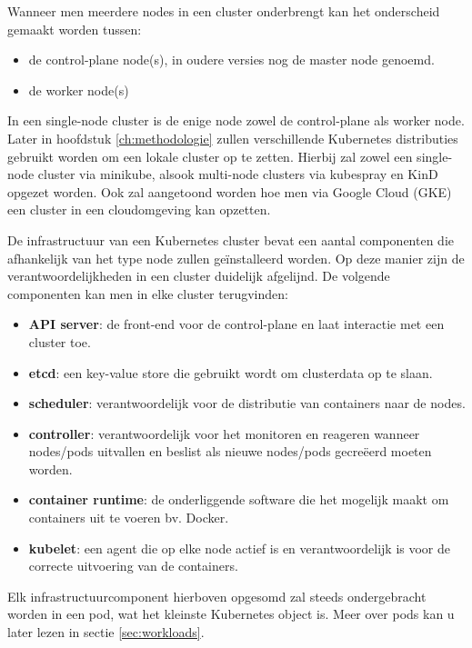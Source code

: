 Wanneer men meerdere nodes in een cluster onderbrengt kan het onderscheid gemaakt worden tussen:

\begin{itemize}
    \item de control-plane node(s), in oudere versies nog de master node genoemd.
    \item de worker node(s)
\end{itemize} 

In een single-node cluster is de enige node zowel de control-plane als worker node.
Later in hoofdstuk \ref{ch:methodologie} zullen verschillende Kubernetes distributies gebruikt worden om een lokale cluster op te zetten. Hierbij zal zowel een single-node cluster via minikube, alsook multi-node clusters via kubespray en KinD opgezet worden. Ook zal aangetoond worden hoe men via Google Cloud (GKE) een cluster in een cloudomgeving kan opzetten.

De infrastructuur van een Kubernetes cluster bevat een aantal componenten die afhankelijk van het type node zullen geïnstalleerd worden. Op deze manier zijn de verantwoordelijkheden in een cluster duidelijk afgelijnd. De volgende componenten kan men in elke cluster terugvinden: 

\begin{itemize}
    \item {\bf API server}: de front-end voor de control-plane en laat interactie met een cluster toe. 
    \item {\bf etcd}: een key-value store die gebruikt wordt om clusterdata op te slaan. 
    \item {\bf scheduler}: verantwoordelijk voor de distributie van containers naar de nodes.
    \item {\bf controller}: verantwoordelijk voor het monitoren en reageren wanneer nodes/pods uitvallen en beslist als nieuwe nodes/pods gecreëerd moeten worden.
    \item {\bf container runtime}: de onderliggende software die het mogelijk maakt om containers uit te voeren bv. Docker. 
    \item {\bf kubelet}: een agent die op elke node actief is en verantwoordelijk is voor de correcte uitvoering van de containers.   
\end{itemize}

Elk infrastructuurcomponent hierboven opgesomd zal steeds ondergebracht worden in een pod, wat het kleinste Kubernetes object is. Meer over pods kan u later lezen in sectie \ref{sec:workloads}.

